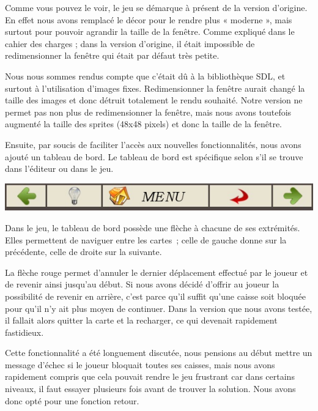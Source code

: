 \documentclass[english,11pt]{report}
\begin{document}
\vspace{0.2cm}
\par
Comme vous pouvez le voir, le jeu se démarque à présent de la version d’origine. En effet nous avons remplacé le décor pour le rendre plus « moderne », mais surtout pour pouvoir agrandir la taille de la fenêtre. Comme expliqué dans le cahier des charges ; dans la version d’origine, il était impossible de redimensionner la fenêtre qui était par défaut très petite.\par
\vspace{0.2cm}
Nous nous sommes rendus compte que c’était dû à la bibliothèque SDL, et surtout à l’utilisation d’images fixes. Redimensionner la fenêtre aurait changé la taille des images et donc détruit totalement le rendu souhaité. Notre version ne permet pas non plus de redimensionner la fenêtre, mais nous avons toutefois augmenté la taille des sprites (48x48 pixels) et donc la taille de la fenêtre.\par
\vspace{0.2cm}
Ensuite, par soucis de faciliter l’accès aux nouvelles fonctionnalités, nous avons ajouté un tableau de bord. Le tableau de bord est spécifique selon s’il se trouve dans l’éditeur ou dans le jeu.\par
\vspace{0.5cm}
\begin{center}
\includegraphics[scale=0.8]{tableau}
\end{center}
\vspace{0.2cm}
\par
Dans le jeu, le tableau de bord possède une flèche à chacune de ses extrémités. Elles permettent de naviguer entre les cartes ; celle de gauche donne sur la précédente, celle de droite sur la suivante.\par
\vspace{0.2cm}
La flèche rouge permet d’annuler le dernier déplacement effectué par le joueur et de revenir ainsi jusqu’au début. Si nous avons décidé d’offrir au joueur la possibilité de revenir en arrière, c'est parce qu'il suffit qu'une caisse soit bloquée pour qu'il n’y ait plus moyen de continuer. Dans la version que nous avons testée, il fallait alors quitter la carte et la recharger, ce qui devenait rapidement fastidieux.\par
\vspace{0.2cm}
Cette fonctionnalité a été longuement discutée, nous pensions au début mettre un message d’échec si le joueur bloquait toutes ses caisses, mais nous avons rapidement compris que cela pouvait rendre le jeu frustrant car dans certains niveaux, il faut essayer plusieurs fois avant de trouver la solution. Nous avons donc opté pour une fonction retour.\par
\end{document}
